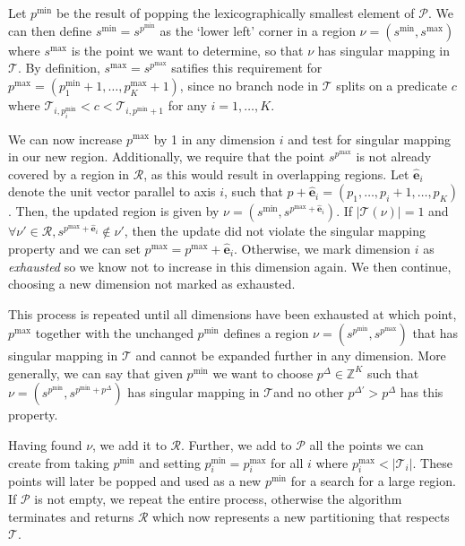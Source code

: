 Let $p^{\min}$ be the result of popping the lexicographically smallest element
of $\mathcal{P}$. We can then define $s^{\min} = s^{p^{\min}}$ as the `lower
left' corner in a region $\nu = (s^{\min}, s^{\max})$ where $s^{\max}$ is the
point we want to determine, so that $\nu$ has singular mapping in $\mathcal{T}$.
By definition, $s^{\max} = s^{p^{\max}}$ satifies this requirement for $p^{\max}
= (p^{\min}_{1} + 1, \ldots, p^{\max}_{K} + 1)$, since no branch node in
$\mathcal{T}$ splits on a predicate $c$ where $\mathcal{T}_{i,p^{\min}_{i}} < c
< \mathcal{T}_{i,p^{\min} + 1}$ for any $i = 1, \ldots, K$. 

We can now increase $p^{\max}$ by 1 in any dimension $i$ and test for singular
mapping in our new region. Additionally, we require that the point
$s^{p^{\max}}$ is not already covered by a region in $\mathcal{R}$, as this
would result in overlapping regions. Let $\mathbf{\hat{e}}_i$ denote the unit
vector parallel to axis $i$, such that $p + \mathbf{\hat{e}}_i = (p_1,\ldots,p_i
+ 1,\ldots,p_K)$. Then, the updated region is given by $\nu = (s^{\min},
s^{p^{\max} + \mathbf{\hat{e}}_{i}})$. If $|\mathcal{T}(\nu)| = 1$ and $\forall
\nu' \in \mathcal{R}, s^{p^{\max} + \mathbf{\hat{e}}_{i}} \notin \nu'$, then the
update did not violate the singular mapping property and we can set $p^{\max} =
p^{\max} + \mathbf{\hat{e}}_{i}$. Otherwise, we mark dimension $i$ as
\textit{exhausted} so we know not to increase in this dimension again. We then
continue, choosing a new dimension not marked as exhausted.

This process is repeated until all dimensions have been exhausted at which
point, $p^{\max}$ together with the unchanged $p^{\min}$ defines a region $\nu =
(s^{p^{\min}}, s^{p^{\max}})$ that has singular mapping in $\mathcal{T}$ and
cannot be expanded further in any dimension. More generally, we can say that
given $p^{\min}$ we want to choose $p^{\Delta} \in \mathbb{Z}^{K}$ such that
$\nu = (s^{p^{\min}}, s^{p^{\min} + p^{\Delta}})$ has singular mapping in
$\mathcal{T} $and no other $p^{\Delta'} > p^{\Delta}$ has this property.

Having found $\nu$, we add it to $\mathcal{R}$. Further, we add to $\mathcal{P}$
all the points we can create from taking $p^{\min}$ and setting $p^{\min}_{i} =
p^{\max}_{i}$ for all $i$ where $p^{\max}_{i} < |\mathcal{T}_{i}|$. These points
will later be popped and used as a new $p^{\min}$ for a search for a large
region. If $\mathcal{P}$ is not empty, we repeat the entire process, otherwise
the algorithm terminates and returns $\mathcal{R}$ which now represents a new
partitioning that respects $\mathcal{T}$.


